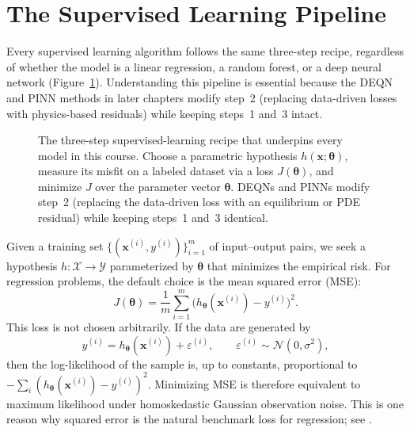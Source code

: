 \documentclass[11pt,a4paper]{report}
\newcommand{\x}{\bm{x}}
\DeclareMathOperator*{\argmin}{arg\,min}
\begin{document}
\section{The Supervised Learning Pipeline}

Every supervised learning algorithm follows the same three-step recipe, regardless of whether the model is a linear regression, a random forest, or a deep neural network (Figure~\ref{fig:ml_recipe}).  Understanding this pipeline is essential because the DEQN and PINN methods in later chapters modify step~2 (replacing data-driven losses with physics-based residuals) while keeping steps~1 and~3 intact.

\begin{figure}[ht]
\centering
{}
\caption{The three-step supervised-learning recipe that underpins every model in this course.  Choose a parametric hypothesis $h(\x;\bm{\theta})$, measure its misfit on a labeled dataset via a loss $J(\bm{\theta})$, and minimize $J$ over the parameter vector $\bm{\theta}$.  DEQNs and PINNs modify step~2 (replacing the data-driven loss with an equilibrium or PDE residual) while keeping steps~1 and~3 identical.}
\label{fig:ml_recipe}
\end{figure}

Given a training set $\{(\x^{(i)}, y^{(i)})\}_{i=1}^{m}$ of input--output pairs, we seek a hypothesis $h:\mathcal{X}\to\mathcal{Y}$ parameterized by $\bm{\theta}$ that minimizes the empirical risk.  For regression problems, the default choice is the mean squared error (MSE):
\begin{equation}
J(\bm{\theta}) = \frac{1}{m}\sum_{i=1}^{m}\big(h_{\bm{\theta}}(\x^{(i)}) - y^{(i)}\big)^{2}.
\label{eq:mse}
\end{equation}
This loss is not chosen arbitrarily.  If the data are generated by
\[
y^{(i)} = h_{\bm{\theta}}(\x^{(i)}) + \varepsilon^{(i)}, \qquad \varepsilon^{(i)} \sim \mathcal{N}(0,\sigma^2),
\]
then the log-likelihood of the sample is, up to constants, proportional to $-\sum_i (h_{\bm{\theta}}(\x^{(i)}) - y^{(i)})^2$.  Minimizing MSE is therefore equivalent to maximum likelihood under homoskedastic Gaussian observation noise.  This is one reason why squared error is the natural benchmark loss for regression; see \citet{bishop2006, goodfellow2016deep, deisenroth2020mathematics}.
\end{document}

